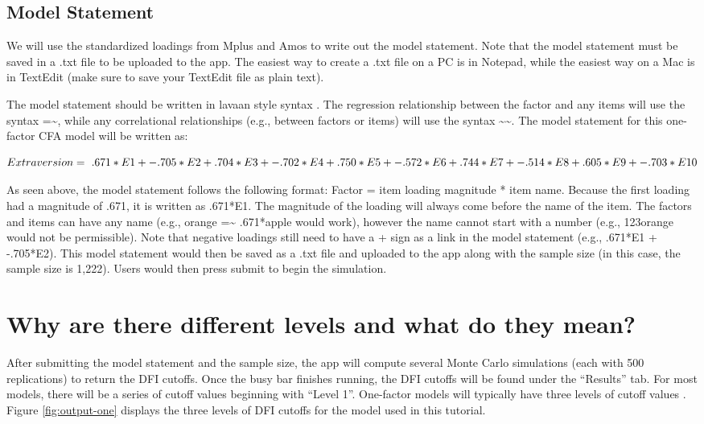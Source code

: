 \documentclass[
]{book}
\begin{document}
\hypertarget{model-statement}{%
\section{Model Statement}\label{model-statement}}

We will use the standardized loadings from Mplus and Amos to write out the model statement. Note that the model statement must be saved in a .txt file to be uploaded to the app. The easiest way to create a .txt file on a PC is in Notepad, while the easiest way on a Mac is in TextEdit (make sure to save your TextEdit file as plain text).

The model statement should be written in lavaan style syntax . The regression relationship between the factor and any items will use the syntax =\textasciitilde, while any correlational relationships (e.g., between factors or items) will use the syntax \textasciitilde\textasciitilde. The model statement for this one-factor CFA model will be written as:

\[ Extraversion =~ .671*E1 + -.705*E2 + .704*E3 + -.702*E4 \\ 
+ .750*E5 + -.572*E6 + .744*E7 + -.514*E8 + .605*E9 + -.703*E10 \]

As seen above, the model statement follows the following format: Factor = item loading magnitude * item name. Because the first loading had a magnitude of .671, it is written as .671*E1. The magnitude of the loading will always come before the name of the item. The factors and items can have any name (e.g., orange =\textasciitilde{} .671*apple would work), however the name cannot start with a number (e.g., 123orange would not be permissible). Note that negative loadings still need to have a + sign as a link in the model statement (e.g., .671*E1 + -.705*E2). This model statement would then be saved as a .txt file and uploaded to the app along with the sample size (in this case, the sample size is 1,222). Users would then press submit to begin the simulation.

\hypertarget{levels}{%
\chapter{Why are there different levels and what do they mean?}\label{levels}}

After submitting the model statement and the sample size, the app will compute several Monte Carlo simulations (each with 500 replications) to return the DFI cutoffs. Once the busy bar finishes running, the DFI cutoffs will be found under the ``Results'' tab. For most models, there will be a series of cutoff values beginning with ``Level 1''. One-factor models will typically have three levels of cutoff values . Figure \ref{fig:output-one} displays the three levels of DFI cutoffs for the model used in this tutorial.
\end{document}
